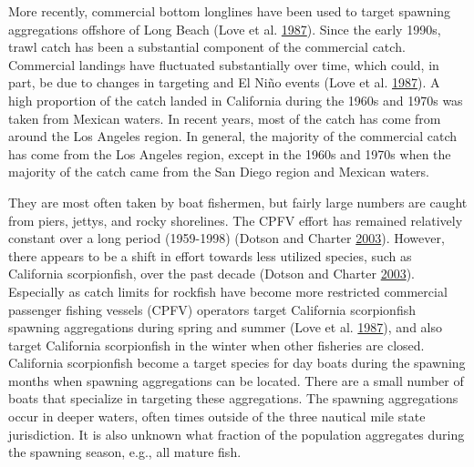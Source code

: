 \documentclass[12pt,]{article}
\begin{document}
More recently, commercial bottom longlines have been used to target
spawning aggregations offshore of Long Beach (Love et al.
\protect\hyperlink{ref-Love1987}{1987}). Since the early 1990s, trawl
catch has been a substantial component of the commercial catch.
Commercial landings have fluctuated substantially over time, which
could, in part, be due to changes in targeting and El Niño events (Love
et al. \protect\hyperlink{ref-Love1987}{1987}). A high proportion of the
catch landed in California during the 1960s and 1970s was taken from
Mexican waters. In recent years, most of the catch has come from around
the Los Angeles region. In general, the majority of the commercial catch
has come from the Los Angeles region, except in the 1960s and 1970s when
the majority of the catch came from the San Diego region and Mexican
waters.

They are most often taken by boat fishermen, but fairly large numbers
are caught from piers, jettys, and rocky shorelines. The CPFV effort has
remained relatively constant over a long period (1959-1998) (Dotson and
Charter \protect\hyperlink{ref-Dotson2003}{2003}). However, there
appears to be a shift in effort towards less utilized species, such as
California scorpionfish, over the past decade (Dotson and Charter
\protect\hyperlink{ref-Dotson2003}{2003}). Especially as catch limits
for rockfish have become more restricted commercial passenger fishing
vessels (CPFV) operators target California scorpionfish spawning
aggregations during spring and summer (Love et al.
\protect\hyperlink{ref-Love1987}{1987}), and also target California
scorpionfish in the winter when other fisheries are closed.\\
California scorpionfish become a target species for day boats during the
spawning months when spawning aggregations can be located. There are a
small number of boats that specialize in targeting these aggregations.
The spawning aggregations occur in deeper waters, often times outside of
the three nautical mile state jurisdiction. It is also unknown what
fraction of the population aggregates during the spawning season, e.g.,
all mature fish.
\end{document}
